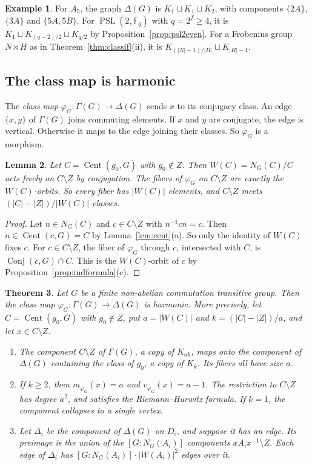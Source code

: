 \documentclass[12pt,letterpaper]{article}
\numberwithin{equation}{section}
\theoremstyle{plain}
\newtheorem{theorem}{Theorem}[section]
\newtheorem{lemma}[theorem]{Lemma}
\theoremstyle{definition}
\newtheorem{example}[theorem]{Example}
\newcommand{\F}{\mathbb{F}}
\DeclareMathOperator{\Cent}{Cent}
\DeclareMathOperator{\Conj}{Conj}
\DeclareMathOperator{\PSL}{PSL}
\begin{document}
\begin{example}\label{ex:cccexamples}
For $A_5$, the graph $\Delta(G)$ is $K_1\sqcup K_1\sqcup K_2$, with
components $\{2A\}$, $\{3A\}$ and $\{5A,5B\}$. For $\PSL(2,\F_q)$ with
$q=2^f\ge4$, it is $K_1\sqcup K_{(q-2)/2}\sqcup K_{q/2}$ by
Proposition~\ref{prop:psl2even}. For a Frobenius group $N\rtimes H$ as in
Theorem~\ref{thm:classif}(ii), it is $K_{(|N|-1)/|H|}\sqcup K_{|H|-1}$.
\end{example}

\subsection{The class map is harmonic}

The \emph{class map} $\varphi_G\colon\Gamma(G)\to\Delta(G)$ sends $x$ to its
conjugacy class. An edge $\{x,y\}$ of $\Gamma(G)$ joins commuting elements.
If $x$ and $y$ are conjugate, the edge is vertical. Otherwise it maps to the
edge joining their classes. So $\varphi_G$ is a morphism.

\begin{lemma}\label{lem:free}
Let $C=\Cent(g_0,G)$ with $g_0\notin Z$. Then $W(C)=N_G(C)/C$ acts freely
on $C\setminus Z$ by conjugation. The fibers of $\varphi_G$ on $C\setminus
Z$ are exactly the $W(C)$-orbits. So every fiber has $|W(C)|$ elements, and
$C\setminus Z$ meets $(|C|-|Z|)/|W(C)|$ classes.
\end{lemma}

\begin{proof}
Let $n\in N_G(C)$ and $c\in C\setminus Z$ with $n^{-1}cn=c$. Then
$n\in\Cent(c,G)=C$ by Lemma~\ref{lem:cent}(a). So only the identity of
$W(C)$ fixes $c$. For $c\in C\setminus Z$, the fiber of $\varphi_G$ through
$c$, intersected with $C$, is $\Conj(c,G)\cap C$. This is the
$W(C)$-orbit of $c$ by Proposition~\ref{prop:indformula}(c).
\end{proof}

\begin{theorem}\label{thm:harmonic}
Let $G$ be a finite non-abelian commutation transitive group. Then the class
map $\varphi_G\colon\Gamma(G)\to\Delta(G)$ is harmonic. More precisely, let
$C=\Cent(g_0,G)$ with $g_0\notin Z$, put $a=|W(C)|$ and
$k=(|C|-|Z|)/a$, and let $x\in C\setminus Z$.
\begin{enumerate}[label=(\alph*),itemsep=1pt]
\item The component $C\setminus Z$ of $\Gamma(G)$, a copy of $K_{ak}$, maps
  onto the component of $\Delta(G)$ containing the class of $g_0$, a copy
  of $K_k$. Its fibers all have size $a$.
\item If $k\ge2$, then $m_{\varphi_G}(x)=a$ and $v_{\varphi_G}(x)=a-1$.
  The restriction to $C\setminus Z$ has degree $a^2$, and satisfies the
  Riemann--Hurwitz formula. If $k=1$, the component collapses to a single
  vertex.
\item Let $\Delta_i$ be the component of $\Delta(G)$ on $D_i$, and suppose
  it has an edge. Its preimage is the union of the $[G:N_G(A_i)]$
  components $xA_ix^{-1}\setminus Z$. Each edge of $\Delta_i$ has
  $[G:N_G(A_i)]\cdot|W(A_i)|^2$ edges over it.
\end{enumerate}
\end{theorem}
\end{document}
